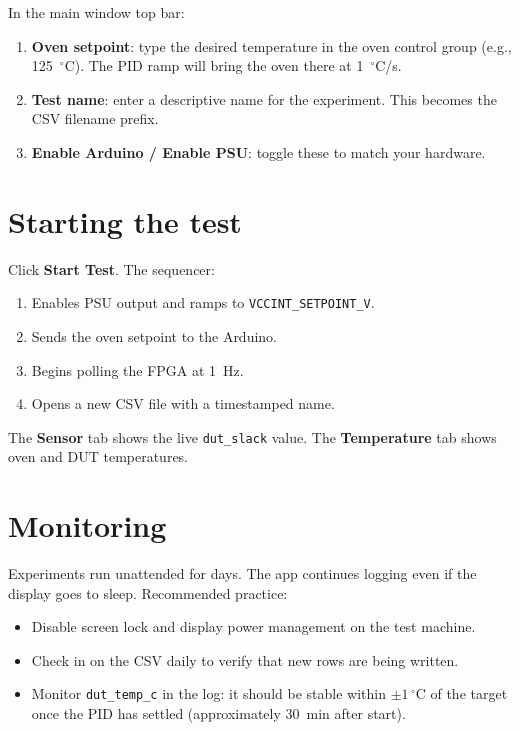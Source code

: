 \documentclass[12pt, a4paper]{report}
\begin{document}
In the main window top bar:

\begin{enumerate}
  \item \textbf{Oven setpoint}: type the desired temperature in the oven control group
        (e.g., 125~$^\circ$C). The PID ramp will bring the oven there at 1~$^\circ$C/s.
  \item \textbf{Test name}: enter a descriptive name for the experiment. This becomes
        the CSV filename prefix.
  \item \textbf{Enable Arduino / Enable PSU}: toggle these to match your hardware.
\end{enumerate}

\section{Starting the test}

Click \textbf{Start Test}. The sequencer:
\begin{enumerate}
  \item Enables PSU output and ramps to \texttt{VCCINT\_SETPOINT\_V}.
  \item Sends the oven setpoint to the Arduino.
  \item Begins polling the FPGA at 1~Hz.
  \item Opens a new CSV file with a timestamped name.
\end{enumerate}

The \textbf{Sensor} tab shows the live \texttt{dut\_slack} value. The
\textbf{Temperature} tab shows oven and DUT temperatures.

\section{Monitoring}

Experiments run unattended for days. The app continues logging even if the
display goes to sleep. Recommended practice:

\begin{itemize}
  \item Disable screen lock and display power management on the test machine.
  \item Check in on the CSV daily to verify that new rows are being written.
  \item Monitor \texttt{dut\_temp\_c} in the log: it should be stable within $\pm 1\,^\circ$C
        of the target once the PID has settled (approximately 30~min after start).
\end{itemize}
\end{document}
